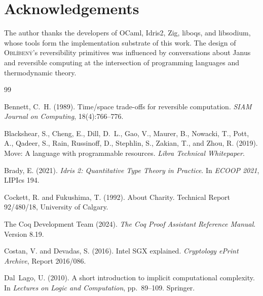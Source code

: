 \documentclass[11pt,a4paper]{article}
\newcommand{\obl}{\textsc{Obl\'{i}ben\'{y}}}
\begin{document}
\section*{Acknowledgements}

The author thanks the developers of OCaml, Idris2, Zig, liboqs, and
libsodium, whose tools form the implementation substrate of this work.  The
design of \obl{}'s reversibility primitives was influenced by conversations
about Janus and reversible computing at the intersection of programming
languages and thermodynamic theory.



\begin{thebibliography}{99}

Bennett, C.~H. (1989).
\newblock Time/space trade-offs for reversible computation.
\newblock \emph{SIAM Journal on Computing}, 18(4):766--776.

Blackshear, S., Cheng, E., Dill, D.~L., Gao, V., Maurer, B., Nowacki, T., Pott, A., Qadeer, S., Rain, Russinoff, D., Stephlin, S., Zakian, T., and Zhou, R. (2019).
\newblock Move: A language with programmable resources.
\newblock \emph{Libra Technical Whitepaper}.

Brady, E. (2021).
\newblock \emph{Idris 2: Quantitative Type Theory in Practice}.
\newblock In \emph{ECOOP 2021}, LIPIcs 194.

Cockett, R. and Fukushima, T. (1992).
\newblock About Charity.
\newblock Technical Report 92/480/18, University of Calgary.

The Coq Development Team (2024).
\newblock \emph{The Coq Proof Assistant Reference Manual}.
\newblock Version 8.19.

Costan, V. and Devadas, S. (2016).
\newblock Intel SGX explained.
\newblock \emph{Cryptology ePrint Archive}, Report 2016/086.

Dal~Lago, U. (2010).
\newblock A short introduction to implicit computational complexity.
\newblock In \emph{Lectures on Logic and Computation}, pp.~89--109. Springer.


\end{thebibliography}
\end{document}
